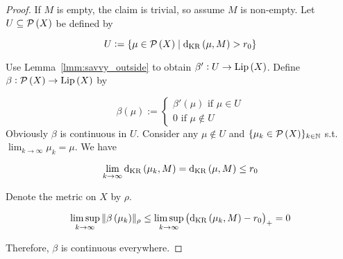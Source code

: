\begin{proof}

If $M$ is empty, the claim is trivial, so assume $M$ is non-empty. Let $U \subseteq \mathcal{P}\left(X\right)$ be defined by

$$U:=\{\mu \in \mathcal{P}\left(X\right) \mid \operatorname{d}_{\textnormal{KR}}\left(\mu, M\right) > r_0\}$$

Use Lemma~\ref{lmm:savvy_outside} to obtain $\beta': U \rightarrow {\operatorname{Lip}}\left(X\right)$. Define $\beta: \mathcal{P}\left(X\right) \rightarrow {\operatorname{Lip}}\left(X\right)$ by

$$\beta\left(\mu\right):=\begin{cases}\beta'\left(\mu\right) \text{ if } \mu \in U\\0 \text { if } \mu \not\in U\end{cases}$$ 
Obviously $\beta$ is continuous in $U$. Consider any $\mu \not\in U$ and $\{\mu_k \in \mathcal{P}\left(X\right)\}_{k \in \mathbb{N}}$ s.t. $\lim_{k \rightarrow \infty} \mu_k = \mu$. We have 

$$\lim_{k \rightarrow \infty} \operatorname{d}_{\textnormal{KR}}\left(\mu_k,M\right) = \operatorname{d}_{\textnormal{KR}}\left(\mu, M\right) \leq r_0$$

Denote the metric on $X$ by $\rho$. 

$$\limsup_{k \rightarrow \infty}{\lVert \beta\left(\mu_k\right) \rVert_\rho} \leq \limsup_{k \rightarrow \infty}{\left(\operatorname{d}_{\textnormal{KR}}\left(\mu_k,M\right) - r_0\right)_+} = 0$$

Therefore, $\beta$ is continuous everywhere.
\end{proof}

